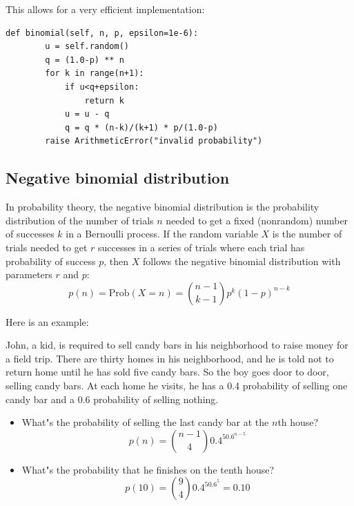 \documentclass[justified, sixbynine]{tufte-book}
\def\ft{\small\tt}
\theoremstyle{plain}%
\newtheorem * {corollary}{Corollary}
\theoremstyle{definition}
\theoremstyle{remark}
\newtheorem * {remark}{Remark}
\newtheorem * {note}{Note}
\begin{document}
\begin{fullwidth}
This allows for a very efficient implementation:

\begin{lstlisting}[caption={in file: {\ft nlib.py}}]
    def binomial(self, n, p, epsilon=1e-6):
        u = self.random()
        q = (1.0-p) ** n
        for k in range(n+1):
            if u<q+epsilon:
                return k
            u = u - q
            q = q * (n-k)/(k+1) * p/(1.0-p)
        raise ArithmeticError("invalid probability")
\end{lstlisting}


\goodbreak\subsection{Negative binomial distribution}

In probability theory, the negative binomial distribution is the probability
distribution of the number of trials $n$ needed to get a fixed
(nonrandom) number of successes $k$ in a Bernoulli process. If the random
variable $X$ is the number of trials needed to get $r$ successes in a series of
trials where each trial has probability of success $p$, then $X$ follows the
negative binomial distribution with parameters $r$ and $p$:
\begin{equation}
p(n)=\textrm{Prob}(X=n)=\binom{n-1}{k-1}p^k(1-p)^{n-k}
\end{equation}

Here is an example:

John, a kid, is required to sell candy bars in his neighborhood to
raise money for a field trip. There are thirty homes in his
neighborhood, and he is told not to return home until he has sold five candy bars.
So the boy goes door to door, selling candy bars. At each home he visits, he
has a 0.4 probability of selling one candy bar and a 0.6 probability of
selling nothing.

\begin{itemize}
\item  What"s the probability of selling the last candy bar at the $n$th house?
\begin{equation}
p(n)=\binom{n-1}40.4^50.6^{n-5}
\end{equation}

\item  What"s the probability that he finishes on the tenth house?
\begin{equation}
p(10)=\binom 940.4^50.6^5=0.10
\end{equation}


\end{itemize}
\end{fullwidth}
\end{document}
